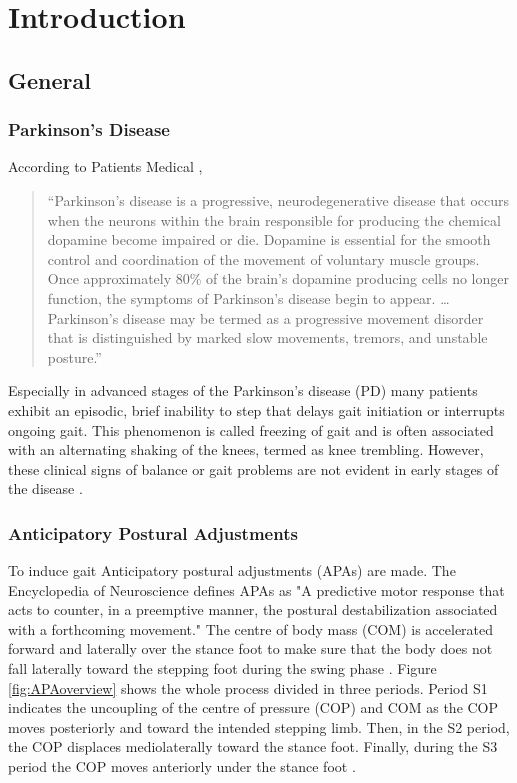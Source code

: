 \chapter{Introduction}
\label{ch:Introduction}

\section{General}

\subsection{Parkinson's Disease}

According to Patients Medical \cite{patients_medical_definition_2014}, \begin{quote}``Parkinson's disease is a progressive, neurodegenerative disease that occurs when the neurons within the brain responsible for producing the chemical dopamine become impaired or die. Dopamine is essential for the smooth control and coordination of the movement of voluntary muscle groups. Once approximately 80\% of the brain's dopamine producing cells no longer function, the symptoms of Parkinson's disease begin to appear. \dots Parkinson's disease may be termed as a progressive movement disorder that is distinguished by marked slow movements, tremors, and unstable posture.''\end{quote}

Especially in advanced stages of the Parkinson's disease (PD) many patients exhibit an episodic, brief inability to step that delays gait initiation or interrupts ongoing gait. This phenomenon is called freezing of gait and is often associated with an alternating shaking of the knees, termed as knee trembling. However, these clinical signs of balance or gait problems are not evident in early stages of the disease \cite{mancini_anticipatory_2009}\cite{jacobs_knee_2009}.

\subsection{Anticipatory Postural Adjustments}

To induce gait Anticipatory postural adjustments (APAs) are made. The Encyclopedia of Neuroscience \cite[p.133]{woollacott_anticipatory_2009} defines APAs as "A predictive motor response that acts to counter, in a preemptive manner, the postural destabilization associated with a forthcoming movement." The centre of body mass (COM) is accelerated forward and laterally over the stance foot to make sure that the body does not fall laterally toward the stepping foot during the swing phase \cite{woollacott_anticipatory_2009}. Figure \ref{fig:APAoverview} shows the whole process divided in three periods. Period S1 indicates the uncoupling of the centre of pressure (COP) and COM as the COP moves posteriorly and toward the intended stepping limb. Then, in the S2 period, the COP displaces mediolaterally toward the stance foot. Finally, during the S3 period the COP moves anteriorly under the stance foot \cite{hass_gait_2005-1}.

